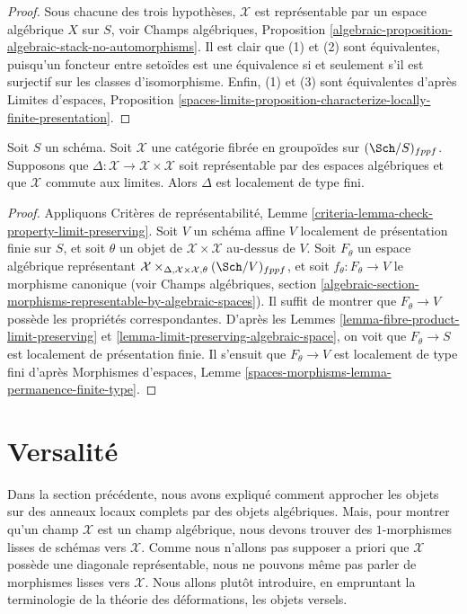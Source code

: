 \begin{proof}
Sous chacune des trois hypothèses, $\mathcal{X}$ est représentable
par un espace algébrique $X$ sur $S$, voir Champs algébriques, Proposition
\ref{algebraic-proposition-algebraic-stack-no-automorphisms}.
Il est clair que (1) et (2) sont équivalentes, puisqu'un foncteur entre
setoïdes est une équivalence si et seulement s'il est surjectif sur les classes
d'isomorphisme. Enfin, (1) et (3) sont équivalentes d'après
Limites d'espaces, Proposition
\ref{spaces-limits-proposition-characterize-locally-finite-presentation}.
\end{proof}

\begin{lemma}
\label{lemma-diagonal}
Soit $S$ un schéma. Soit $\mathcal{X}$ une catégorie fibrée
en groupoïdes sur $(\Sch/S)_{fppf}$. Supposons que
$\Delta : \mathcal{X} \to \mathcal{X} \times \mathcal{X}$ soit
représentable par des espaces algébriques et que $\mathcal{X}$ commute aux limites.
Alors $\Delta$ est localement de type fini.
\end{lemma}

\begin{proof}
Appliquons Critères de représentabilité, Lemme
\ref{criteria-lemma-check-property-limit-preserving}.
Soit $V$ un schéma affine $V$ localement de présentation finie sur $S$,
et soit $\theta$ un objet de $\mathcal{X} \times \mathcal{X}$
au-dessus de $V$. Soit $F_\theta$ un espace algébrique représentant
$\mathcal{X} \times_{\Delta, \mathcal{X} \times \mathcal{X}, \theta}
(\Sch/V)_{fppf}$, et soit $f_\theta : F_\theta \to V$ le morphisme canonique
(voir Champs algébriques, section
\ref{algebraic-section-morphisms-representable-by-algebraic-spaces}).
Il suffit de montrer que
$F_\theta \to V$ possède les propriétés correspondantes. D'après les
Lemmes \ref{lemma-fibre-product-limit-preserving} et
\ref{lemma-limit-preserving-algebraic-space},
on voit que $F_\theta \to S$ est localement de présentation finie.
Il s'ensuit que $F_\theta \to V$ est localement de type fini
d'après Morphismes d'espaces, Lemme
\ref{spaces-morphisms-lemma-permanence-finite-type}.
\end{proof}
 
 
 
 
 
 
\section{Versalité}
\label{section-versality}

\noindent
Dans la section précédente, nous avons expliqué comment approcher les objets sur
des anneaux locaux complets par des objets algébriques. Mais, pour montrer
qu'un champ $\mathcal{X}$ est un champ algébrique, nous devons trouver des
$1$-morphismes lisses de schémas vers $\mathcal{X}$. Comme nous n'allons pas
supposer a priori que $\mathcal{X}$ possède une diagonale représentable, nous
ne pouvons même pas parler de morphismes lisses vers $\mathcal{X}$. Nous allons
plutôt introduire, en empruntant la terminologie de la théorie des déformations,
les objets versels.


